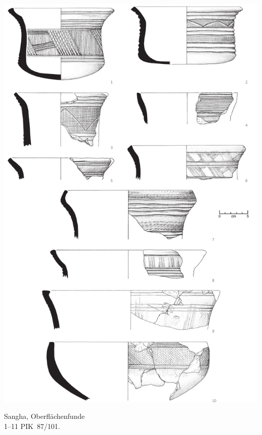 \begin{pl}[H]
	\includegraphics{plt/Taf50.pdf}
	\vspace{.75em}\caption{\mbox{Sangha}, Oberflächenfunde \\ 1--11 PIK~87/101.}
	\label{pl:50}
\end{pl}

